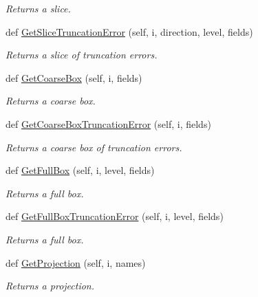 \begin{DoxyCompactItemize}
\begin{DoxyCompactList}\small\item\em Returns a slice. \end{DoxyCompactList}\item 
def \mbox{\hyperlink{classpySledgehamr_1_1Output_1_1Output_a2329ab2824cc1b22615347a7bac1f98f}{Get\+Slice\+Truncation\+Error}} (self, i, direction, level, fields)
\begin{DoxyCompactList}\small\item\em Returns a slice of truncation errors. \end{DoxyCompactList}\item 
def \mbox{\hyperlink{classpySledgehamr_1_1Output_1_1Output_adb45cd0e082a0428b86c1d77faae8cc8}{Get\+Coarse\+Box}} (self, i, fields)
\begin{DoxyCompactList}\small\item\em Returns a coarse box. \end{DoxyCompactList}\item 
def \mbox{\hyperlink{classpySledgehamr_1_1Output_1_1Output_a3cb3dfd7b75646e722b7f527ec610485}{Get\+Coarse\+Box\+Truncation\+Error}} (self, i, fields)
\begin{DoxyCompactList}\small\item\em Returns a coarse box of truncation errors. \end{DoxyCompactList}\item 
def \mbox{\hyperlink{classpySledgehamr_1_1Output_1_1Output_a1a54898f0f9116a224424a7937ec7711}{Get\+Full\+Box}} (self, i, level, fields)
\begin{DoxyCompactList}\small\item\em Returns a full box. \end{DoxyCompactList}\item 
def \mbox{\hyperlink{classpySledgehamr_1_1Output_1_1Output_a7cdd093d84b22bbc66acb6a6de474d13}{Get\+Full\+Box\+Truncation\+Error}} (self, i, level, fields)
\begin{DoxyCompactList}\small\item\em Returns a full box. \end{DoxyCompactList}\item 
def \mbox{\hyperlink{classpySledgehamr_1_1Output_1_1Output_a9061b33b7378f540d7ecef65a94f2c46}{Get\+Projection}} (self, i, names)
\begin{DoxyCompactList}\small\item\em Returns a projection. \end{DoxyCompactList}\item 

\end{DoxyCompactItemize}

